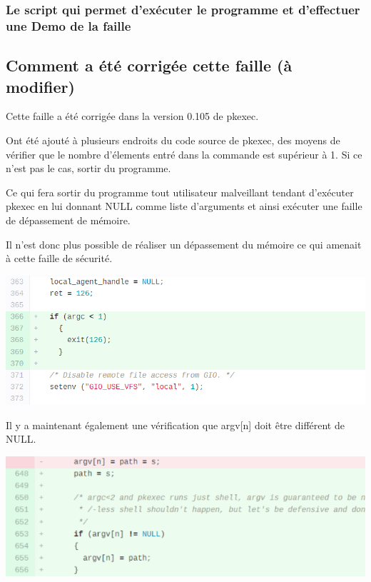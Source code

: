 \documentclass[12pt,a4paper]{article}
\begin{document}
			\subsubsection{Le script qui permet d'exécuter le programme et d'effectuer une Demo de la faille} 
			  
   
		\subsection{Comment a été corrigée cette faille (à modifier)}
            \begin{flushleft}
                \noindent Cette faille a été corrigée dans la version 0.105 de pkexec.
                \item Ont été ajouté à plusieurs endroits du code source de pkexec, des moyens de vérifier que le nombre d'élements entré dans la commande est supérieur à 1. Si ce n'est pas le cas, sortir du programme. 
                \item Ce qui fera sortir du programme tout utilisateur malveillant tendant d'exécuter pkexec en lui donnant NULL comme liste d'arguments et ainsi exécuter une faille de dépassement de mémoire. \cite{pkexeclo25:online} 
                \item Il n'est donc plus possible de réaliser un dépassement du mémoire ce qui amenait à cette faille de sécurité.
                \begin{center}
                    \includegraphics[scale=0.5]{verifargcsize}
                    \cite{securitytrack:online}
                \end{center}
                \item Il y a maintenant également une vérification que argv[n] doit être différent de NULL.
                \begin{center}
                    \includegraphics[scale=0.5]{verifisnull}
                    \cite{securitytrack:online}
                \end{center}
            \end{flushleft}
            
\end{document}
